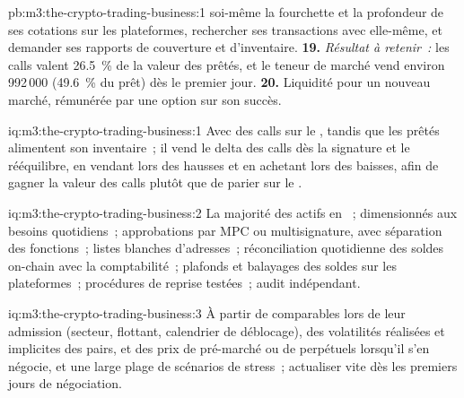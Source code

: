 \begin{solution}{pb:m3:the-crypto-trading-business:1}
soi-même la fourchette et la profondeur de ses cotations sur les plateformes, rechercher ses transactions avec elle-même, et demander ses rapports de couverture et d'inventaire. \textbf{19.}
\emph{Résultat à retenir~:} les calls valent 26.5~\% de la valeur des  prêtés, et le teneur de marché vend environ 992\,000  (49.6~\% du prêt) dès le premier
jour. \textbf{20.} Liquidité pour un nouveau marché, rémunérée par une option sur son succès.
\end{solution}

\begin{solution}{iq:m3:the-crypto-trading-business:1}
Avec des calls sur le , tandis que les  prêtés alimentent son inventaire~; il vend le delta des calls dès la signature et le rééquilibre, en vendant lors des hausses et
en achetant lors des baisses, afin de gagner la valeur des calls plutôt que de parier sur le .
\end{solution}

\begin{solution}{iq:m3:the-crypto-trading-business:2}
La majorité des actifs en ~;  dimensionnés aux besoins quotidiens~; approbations par MPC ou multisignature, avec séparation des fonctions~; listes blanches d'adresses~; réconciliation quotidienne
des soldes on-chain avec la comptabilité~; plafonds et balayages des soldes sur les plateformes~; procédures de reprise testées~; audit indépendant.
\end{solution}

\begin{solution}{iq:m3:the-crypto-trading-business:3}
À partir de  comparables lors de leur admission (secteur, flottant, calendrier de déblocage), des volatilités réalisées et implicites des pairs, et des prix de pré-marché ou de perpétuels
lorsqu'il s'en négocie, et une large plage de scénarios de stress~; actualiser vite dès les premiers jours de négociation.
\end{solution}

